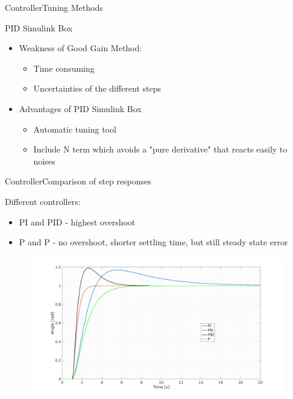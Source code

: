 \begin{frame}{Controller}{Tuning Methods}
  \begin{block}{PID Simulink Box}


	  \begin{itemize}
	  	\item Weakness of Good Gain Method:
	  		  \begin{itemize}
	  	\item Time consuming
	  	\item Uncertainties of the different steps
	  \end{itemize}
	  \item Advantages of PID Simulink Box
	  \begin{itemize}
	  	\item Automatic tuning tool
	  	\item Include N term which avoids a "pure derivative" that reacts easily to noises
	  \end{itemize}
	  \end{itemize}
  
  \end{block}
\end{frame}

\begin{frame}{Controller}{Comparison of step responses}
  \begin{block}{Different controllers:}
  
	  \begin{itemize}
	  	\item PI and PID - highest overshoot
	  	\item P and P - no overshoot, shorter settling time, but still steady state error
	  \end{itemize}

	  \begin{figure}
        \includegraphics[scale=0.18]{../report/figures/full_comp.png}
      \end{figure}
  
  \end{block}
\end{frame}

